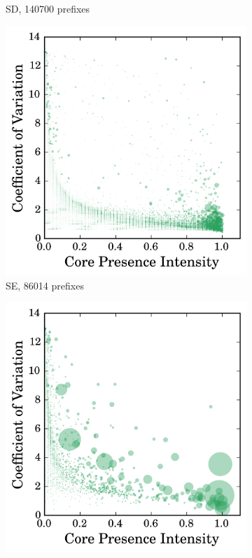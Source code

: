 \begin{figure}
\begin{subfigure}[b]{0.49\textwidth}
                \caption{SD, 140700 prefixes}
                \label{fig:cv_cp_sd}
        \end{subfigure}
        \begin{subfigure}[b]{0.49\textwidth}
                \includegraphics[width=\textwidth]{gfx/chap2/corre_cv_cp_se.png}
                \caption{SE, 86014 prefixes}
                \label{fig:cv_cp_se}
        \end{subfigure}
        \begin{subfigure}[b]{0.49\textwidth}
                \includegraphics[width=\textwidth]{gfx/chap2/corre_cv_cp_sf.png}

\end{subfigure}
\end{figure}
